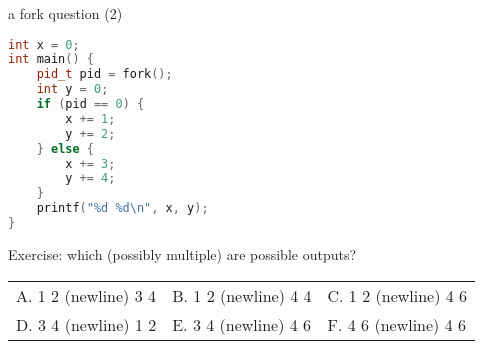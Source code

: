 \begin{frame}[fragile,label=forkQuestion2]{a fork question (2)}
\vspace{-.3cm}
\begin{lstlisting}[language=C++,style=size10]
int x = 0;
int main() {
    pid_t pid = fork();
    int y = 0;
    if (pid == 0) {
        x += 1;
        y += 2;
    } else {
        x += 3;
        y += 4;
    }
    printf("%d %d\n", x, y);
}
\end{lstlisting}
\small Exercise: which (possibly multiple) are possible outputs?
\begin{tabular}{lll}
A. 1 2 (newline) 3 4 &
B. 1 2 (newline) 4 4 &
C. 1 2 (newline) 4 6 \\
D. 3 4 (newline) 1 2 &
E. 3 4 (newline) 4 6 &
F. 4 6 (newline) 4 6 \\
\end{tabular}
\end{frame}

